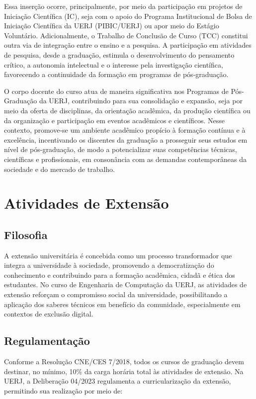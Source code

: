 Essa inserção ocorre, principalmente, por meio da participação em projetos de Iniciação Científica (IC), seja com o apoio do Programa Institucional de Bolsa de Iniciação Científica da UERJ (PIBIC/UERJ) ou apor meio do Estágio Voluntário. Adicionalmente, o Trabalho de Conclusão de Curso (TCC) constitui outra via de integração entre o ensino e a pesquisa. A participação em atividades de pesquisa, desde a graduação, estimula o desenvolvimento do pensamento crítico, a autonomia intelectual e o interesse pela investigação científica, favorecendo a continuidade da formação em programas de pós-graduação.

O corpo docente do curso atua de maneira significativa nos Programas de Pós-Graduação da UERJ, contribuindo para sua consolidação e expansão, seja por meio da oferta de disciplinas, da orientação acadêmica, da produção científica ou da organização e participação em eventos acadêmicos e científicos. Nesse contexto, promove-se um ambiente acadêmico propício à formação contínua e à excelência, incentivando os discentes da graduação a prosseguir seus estudos em nível de pós-graduação, de modo a potencializar suas competências técnicas, científicas e profissionais, em consonância com as demandas contemporâneas da sociedade e do mercado de trabalho.

\section{Atividades de Extensão}

\subsection{Filosofia}
A extensão universitária é concebida como um processo transformador que integra a universidade à sociedade, promovendo a democratização do conhecimento e contribuindo para a formação acadêmica, cidadã e ética dos estudantes. No curso de Engenharia de Computação da UERJ, as atividades de extensão reforçam o compromisso social da universidade, possibilitando a aplicação dos saberes técnicos em benefício da comunidade, especialmente em contextos de exclusão digital.

\subsection{Regulamentação}
Conforme a Resolução CNE/CES  7/2018, todos os cursos de graduação devem destinar, no mínimo, 10\% da carga horária total às atividades de extensão. Na UERJ, a Deliberação  04/2023 regulamenta a curricularização da extensão, permitindo sua realização por meio de:

